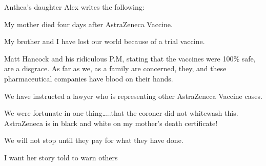 Anthea’s daughter Alex writes the following:

My mother died four days after AstraZeneca Vaccine.

My brother and I have lost our world because of a trial vaccine.

Matt Hancock and his ridiculous P.M, stating that the vaccines were 100\% safe,
are a disgrace. As far as we, as a family are concerned, they, and these
pharmaceutical companies have blood on their hands.

We have instructed a lawyer who is representing other AstraZeneca Vaccine cases.

We were fortunate in one thing…..that the coroner did not whitewash
this. AstraZeneca is in black and white on my mother’s death certificate!

We will not stop until they pay for what they have done.

I want her story told to warn others
